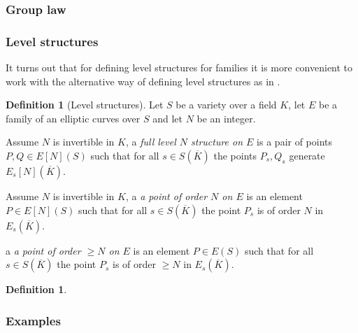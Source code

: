 \documentclass[a4paper,12pt,reqno]{amsart}
\theoremstyle{definition}
\newtheorem{definition}[lemma]{Definition}
\numberwithin{lemma}{section}
\numberwithin{equation}{section}
\numberwithin{figure}{section}
\begin{document}


\subsubsection{Group law}

\subsubsection{Level structures}

It turns out that for defining level structures for families it is more convenient to work with the alternative way of defining level structures as in .
\begin{definition}[Level structures]\label{def:level-structures-over-var}
	Let $S$ be a variety over a field $K$, let $E$ be a family of an elliptic curves over $S$ and let $N$ be an integer. 
	\begin{defenum}
		\item Assume $N$ is invertible in $K$, a \textit{full level $N$ structure on $E$} is a pair of points $P,Q \in E[N](S)$  such that for all $s \in S(\overline K)$ the points $P_s, Q_s$ generate $E_s[N](\overline K)$. \label{def:full-level-structure-over-var}
		\item Assume $N$ is invertible in $K$,  a \textit{a point of order $N$ on $E$} is an element $P \in E[N](S)$ such that  for all $s \in S(\overline K)$ the point $P_s$ is of order $N$ in $E_s(\overline K)$.  \label{def:point-of-order-N-over-var}
		\item  a \textit{a point of order $\geq N$ on $E$} is an element $P \in E(S)$ such that  for all $s \in S(\overline K)$ the point $P_s$ is of order $\geq N$ in $E_s(\overline K)$.\label{def:point-of-order-geq-N-over-var}
	\end{defenum}
\end{definition}

\begin{definition}
	\hspace{1em}
\end{definition}

\subsubsection{Examples}
\end{document}
